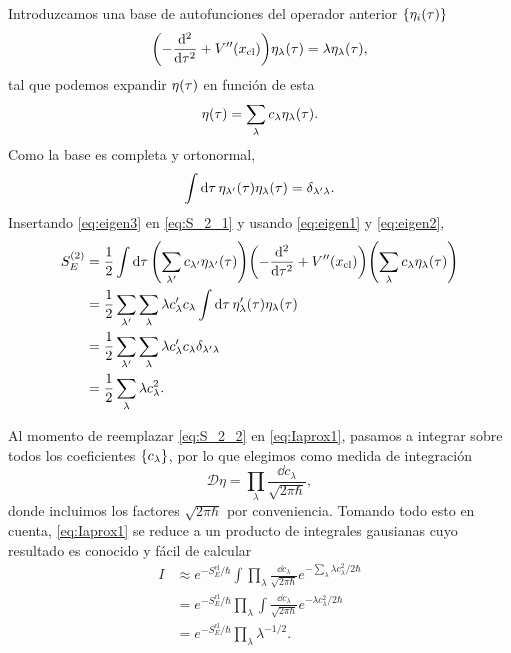 Introduzcamos una base de autofunciones del operador anterior $\qty{\eta_i \qty(\tau)}$ \cite{rubakov2009classical}
\begin{equation} \label{eq:eigen1}
\qty( - \dv[2]{\tau} + V''\qty(x_{\text{cl}})) \eta_\lambda\qty(\tau) = \lambda \eta_\lambda\qty(\tau),
\end{equation}
tal que podemos expandir $\eta\qty(\tau)$ en función de esta
 \begin{equation}\label{eq:eigen3}
\eta\qty(\tau) = \sum_\lambda c_\lambda \eta_\lambda \qty(\tau). 
\end{equation}
Como la base es completa y ortonormal, 
\begin{equation} \label{eq:eigen2}
\int \dd{\tau} \eta_{\lambda'}\qty(\tau) \eta_{\lambda}\qty(\tau) = \delta_{\lambda'\lambda}.
\end{equation}
Insertando \eqref{eq:eigen3} en \eqref{eq:S_2_1} y usando \eqref{eq:eigen1} y \eqref{eq:eigen2},
\begin{align}
S_E^{(2)} &= \frac{1}{2} \int \dd{\tau}\qty( \sum_{\lambda'} c_{\lambda'} \eta_{\lambda'} \qty(\tau)) \qty(-\dv[2]{\tau} + V''\qty(x_{\text{cl}})) \qty( \sum_\lambda c_\lambda \eta_\lambda \qty(\tau)) \\
&= \frac{1}{2} \sum_{\lambda'} \sum_\lambda \lambda c_\lambda' c_\lambda \int \dd{\tau} \eta_\lambda' \qty(\tau)  \eta_\lambda \qty(\tau) \\
&= \frac{1}{2} \sum_{\lambda'} \sum_\lambda \lambda c_\lambda' c_\lambda \delta_{\lambda'\lambda} \\
&= \frac{1}{2} \sum_\lambda \lambda c_\lambda^2. \label{eq:S_2_2}
\end{align}

Al momento de reemplazar \eqref{eq:S_2_2} en \eqref{eq:Iaprox1}, pasamos a integrar sobre todos los coeficientes $\qty{c_\lambda}$, por lo que elegimos como medida de integración 
\begin{equation}
	\mathcal{D}\eta = \prod_\lambda \frac{\dd{c_\lambda}}{\sqrt{2\pi \hbar}},
\end{equation}
donde incluimos los factores $\sqrt{2\pi \hbar}$ por conveniencia. 
Tomando todo esto en cuenta, \eqref{eq:Iaprox1} se reduce a un producto de integrales gausianas cuyo resultado es conocido y fácil de calcular
\begin{align} 
I &\approx e^{-S_E^{\textrm{cl}}/\hbar} \int \prod_\lambda \frac{\dd{c_\lambda}}{\sqrt{2\pi \hbar}} e^{-\sum_\lambda \lambda c_\lambda^2/2\hbar} \\
&= e^{-S_E^{\textrm{cl}}/\hbar} \prod_\lambda \int  \frac{\dd{c_\lambda}}{\sqrt{2\pi \hbar}} e^{-\lambda c_\lambda^2/2\hbar} \\ \label{eq:I_gauss}
&= e^{-S_E^{\textrm{cl}}/\hbar} \prod_\lambda \lambda^{ -1/2}.
\end{align}

